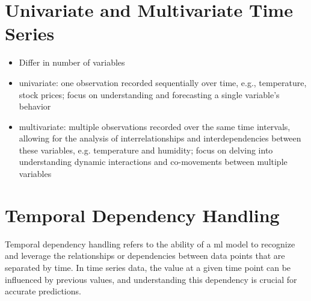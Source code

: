 \section{Univariate and Multivariate Time Series}
\begin{itemize}
    \item Differ in number of variables
    \item univariate: one observation recorded sequentially over time, e.g., temperature, stock prices; focus on understanding and forecasting a single variable's behavior
    \item multivariate: multiple observations recorded over the same time intervals, allowing for the analysis of interrelationships and interdependencies between these variables, e.g. temperature and humidity; focus on delving into understanding dynamic interactions and co-movements between multiple variables
\end{itemize}

\section{Temporal Dependency Handling}
Temporal dependency handling refers to the ability of a \acs{ml} model to recognize and leverage the relationships or dependencies between data points that are separated by time. 
In time series data, the value at a given time point can be influenced by previous values, and understanding this dependency is crucial for accurate predictions.

